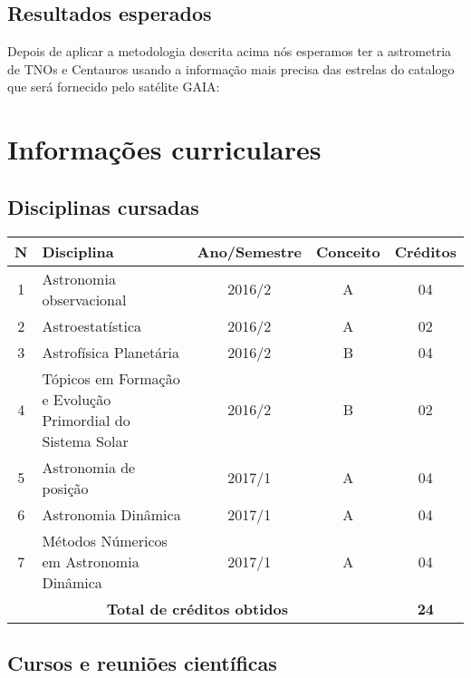 \documentclass[a4paper, 11pt]{article}
\begin{document}
\subsection{Resultados esperados}

Depois de aplicar a metodologia descrita acima nós esperamos ter a astrometria de TNOs e Centauros usando a informação mais precisa das estrelas do catalogo que será fornecido pelo satélite GAIA:

\section{Informa\c{c}\~oes curriculares}

\subsection{Disciplinas cursadas}

\begin{center}
\begin{tabular}{clccc}
\toprule
\textbf{N}&$\hspace{2cm}$\textbf{Disciplina} &\textbf{Ano/Semestre}&\textbf{Conceito}& \textbf{Cr\'editos} \\ \midrule
1 & Astronomia observacional                                             & 2016/2 & A & 04 \\ 
2 & Astroestatística                                                     & 2016/2 & A & 02 \\ 
3 & Astrofísica Planetária                                               & 2016/2 & B & 04 \\ 
4 & Tópicos em Formação e Evolução Primordial do Sistema Solar           & 2016/2 & B & 02 \\
5 & Astronomia de posição                                                & 2017/1 & A & 04 \\ 
6 & Astronomia Dinâmica                                                  & 2017/1 & A & 04 \\ 
7 & Métodos Númericos em Astronomia Dinâmica                             & 2017/1 & A & 04 \\ \midrule 
\multicolumn{4}{c}{\textbf{Total de cr\'editos obtidos}}               & \textbf{24} \\ \bottomrule
\end{tabular}
\end{center}

\subsection{Cursos e reuni\~oes cient\'ificas}
\end{document}
